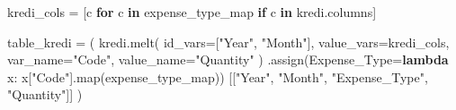 \documentclass[
  11pt,
  a4paper,
]{article}
\newenvironment{Shaded}{\begin{snugshade}}{\end{snugshade}}
\newcommand{\BuiltInTok}[1]{\textcolor[rgb]{0.00,0.23,0.31}{#1}}
\newcommand{\ControlFlowTok}[1]{\textcolor[rgb]{0.00,0.23,0.31}{\textbf{#1}}}
\newcommand{\KeywordTok}[1]{\textcolor[rgb]{0.00,0.23,0.31}{\textbf{#1}}}
\newcommand{\NormalTok}[1]{\textcolor[rgb]{0.00,0.23,0.31}{#1}}
\newcommand{\OperatorTok}[1]{\textcolor[rgb]{0.37,0.37,0.37}{#1}}
\newcommand{\StringTok}[1]{\textcolor[rgb]{0.13,0.47,0.30}{#1}}
\begin{document}
\begin{Shaded}
\begin{Highlighting}[]
\NormalTok{kredi\_cols }\OperatorTok{=}\NormalTok{ [c }\ControlFlowTok{for}\NormalTok{ c }\KeywordTok{in}\NormalTok{ expense\_type\_map }\ControlFlowTok{if}\NormalTok{ c }\KeywordTok{in}\NormalTok{ kredi.columns]}

\NormalTok{table\_kredi }\OperatorTok{=}\NormalTok{ (}
\NormalTok{    kredi.melt(}
\NormalTok{        id\_vars}\OperatorTok{=}\NormalTok{[}\StringTok{"Year"}\NormalTok{, }\StringTok{"Month"}\NormalTok{],}
\NormalTok{        value\_vars}\OperatorTok{=}\NormalTok{kredi\_cols,}
\NormalTok{        var\_name}\OperatorTok{=}\StringTok{"Code"}\NormalTok{,}
\NormalTok{        value\_name}\OperatorTok{=}\StringTok{"Quantity"}
\NormalTok{    )}
\NormalTok{    .assign(Expense\_Type}\OperatorTok{=}\KeywordTok{lambda}\NormalTok{ x: x[}\StringTok{"Code"}\NormalTok{].}\BuiltInTok{map}\NormalTok{(expense\_type\_map))}
\NormalTok{    [[}\StringTok{"Year"}\NormalTok{, }\StringTok{"Month"}\NormalTok{, }\StringTok{"Expense\_Type"}\NormalTok{, }\StringTok{"Quantity"}\NormalTok{]]}
\NormalTok{)}


\end{Highlighting}
\end{Shaded}
\end{document}
